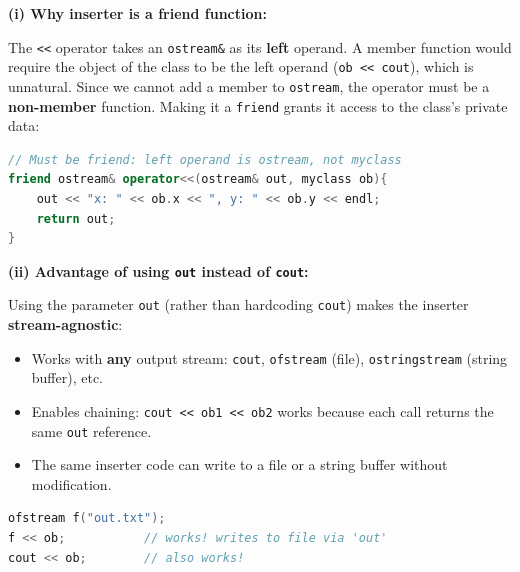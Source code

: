 \documentclass[12pt,a3paper]{article}
\begin{document}
\begin{enumerate}
\begin{tcolorbox}[enhanced,breakable,ansbox,colback=cA!4,colframe=cA,
  boxrule=0.8pt,arc=5pt,
  title={\textbf{Answer --- Why inserter uses friend; advantage of \texttt{out} over \texttt{cout}}},
  fonttitle=\bfseries\color{white},colbacktitle=cA]

\textbf{(i) Why inserter is a friend function:}

The \texttt{<<} operator takes an \texttt{ostream\&} as its
\textbf{left} operand.  A member function would require the object
of the class to be the left operand (\texttt{ob << cout}), which
is unnatural.  Since we cannot add a member to \texttt{ostream},
the operator must be a \textbf{non-member} function.  Making it a
\texttt{friend} grants it access to the class's private data:

\begin{lstlisting}[language=C++]
// Must be friend: left operand is ostream, not myclass
friend ostream& operator<<(ostream& out, myclass ob){
    out << "x: " << ob.x << ", y: " << ob.y << endl;
    return out;
}
\end{lstlisting}

\textbf{(ii) Advantage of using \texttt{out} instead of \texttt{cout}:}

Using the parameter \texttt{out} (rather than hardcoding
\texttt{cout}) makes the inserter \textbf{stream-agnostic}:

\begin{itemize}[itemsep=2pt]
  \item Works with \textbf{any} output stream: \texttt{cout},
    \texttt{ofstream} (file), \texttt{ostringstream} (string buffer),
    etc.
  \item Enables chaining: \texttt{cout << ob1 << ob2} works because
    each call returns the same \texttt{out} reference.
  \item The same inserter code can write to a file or a string buffer
    without modification.
\end{itemize}

\begin{lstlisting}[language=C++]
ofstream f("out.txt");
f << ob;           // works! writes to file via 'out'
cout << ob;        // also works!
\end{lstlisting}

\end{tcolorbox}




\end{enumerate}
\end{document}

